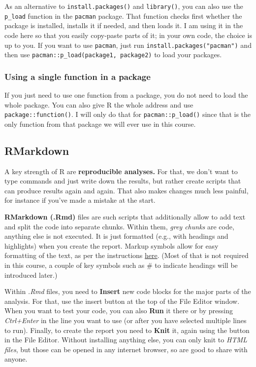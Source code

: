 \documentclass[
]{book}
\begin{document}
As an alternative to \texttt{install.packages()} and \texttt{library()}, you can also use the \texttt{p\_load} function in the \texttt{pacman} package. That function checks first whether the package is installed, installs it if needed, and then loads it. I am using it in the code here so that you easily copy-paste parts of it; in your own code, the choice is up to you. If you want to use \texttt{pacman}, just run \texttt{install.packages("pacman")} and then use \texttt{pacman::p\_load(package1,\ package2)} to load your packages.

\hypertarget{using-a-single-function-in-a-package}{%
\subsubsection{Using a single function in a package}\label{using-a-single-function-in-a-package}}

If you just need to use one function from a package, you do not need to load the whole package. You can also give R the whole address and use \texttt{package::function()}. I will only do that for \texttt{pacman::p\_load()} since that is the only function from that package we will ever use in this course.

\hypertarget{rmarkdown}{%
\subsection{RMarkdown}\label{rmarkdown}}

A key strength of R are \textbf{reproducible analyses.} For that, we don't want to type commands and just write down the results, but rather create scripts that can produce results again and again. That also makes changes much less painful, for instance if you've made a mistake at the start.

\textbf{RMarkdown (.Rmd)} files are such scripts that additionally allow to add text and split the code into separate chunks. Within them, \emph{grey chunks} are code, anything else is not executed. It is just formatted (e.g., with headings and highlights) when you create the report. Markup symbols allow for easy formatting of the text, as per the instructions \href{https://rmarkdown.rstudio.com/authoring_basics.html}{here}. (Most of that is not required in this course, a couple of key symbols such as \# to indicate headings will be introduced later.)

Within \emph{.Rmd} files, you need to \textbf{Insert} new code blocks for the major parts of the analysis. For that, use the insert button at the top of the File Editor window. When you want to test your code, you can also \textbf{Run} it there or by pressing \emph{Ctrl+Enter} in the line you want to use (or after you have selected multiple lines to run). Finally, to create the report you need to \textbf{Knit} it, again using the button in the File Editor. Without installing anything else, you can only knit to \emph{HTML files}, but those can be opened in any internet browser, so are good to share with anyone.
\end{document}
